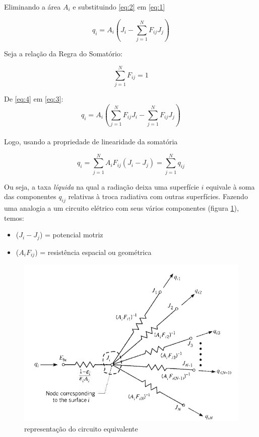 \documentclass[12pt,a4paper]{article}
\begin{document}
Eliminando a área $A_{i}$ e substituindo \ref{eq:2} em \ref{eq:1}

\begin{equation}
q_{i}=A_{i}\left(  J_{i} - \sum _{j=1}^{N}{F_{ij}J_{j}}  \right)
\label{eq:3}
\end{equation}

Seja a relação da Regra do Somatório:

\begin{equation}
\sum _{j=1}^{N}{F_{ij}} = 1
\label{eq:4}
\end{equation}

De \ref{eq:4} em \ref{eq:3}:
\[
q_{i}=A_{i}\left(  \sum _{j=1}^{N}{F_{ij}}J_{i} - \sum _{j=1}^{N}{F_{ij}J_{j}}  \right)
\]
\\
Logo, usando a propriedade de linearidade da somatória

\begin{equation}
q_{i}=\sum _{j=1}^{N}{A_{i}F_{ij}(  J_{i} - J_{j}  )} = \sum _{j=1}^{N}q_{ij}
\label{eq:5}
\end{equation}

Ou seja, a taxa \textit{líquida} na qual a radiação deixa uma superfície $i$ equivale à soma das componentes $q_{ij}$ relativas à troca radiativa com outras superfícies. Fazendo uma analogia a um circuito elétrico com seus vários componentes (figura \ref{fig:1}), temos:

\begin{itemize}
\item ($J_{i}-J_{j}$) = potencial motriz
\item ($A_{i}F_{ij}$) = resistência espacial ou geométrica
\end{itemize}

\begin{figure}[h]
\begin{center}
\includegraphics[scale=0.4]{./fig/1.png}
\caption{\label{fig:1}representação do circuito equivalente}
\end{center}
\end{figure}
\end{document}
